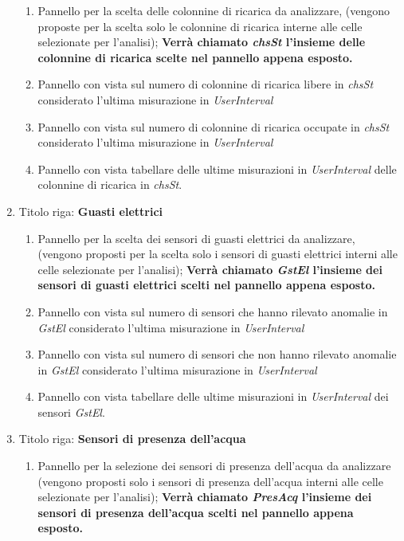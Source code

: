 \begin{enumerate}
\begin{enumerate}
    \item Pannello per la scelta delle colonnine di ricarica da analizzare, (vengono proposte per la scelta solo le  colonnine di ricarica interne alle celle selezionate per l'analisi);
    \textbf{Verrà chiamato \textit{chsSt} l'insieme delle  colonnine di ricarica scelte nel pannello appena esposto.}
    \item Pannello con vista sul numero di colonnine di ricarica libere in \textit{chsSt} considerato l'ultima misurazione in
    \textit{UserInterval} 
    \item Pannello con vista sul numero di colonnine di ricarica occupate in \textit{chsSt} considerato l'ultima misurazione in \textit{UserInterval} 
    \item Pannello con vista tabellare delle ultime misurazioni in \textit{UserInterval} delle colonnine di ricarica in \textit{chsSt}.
\end{enumerate}
\item Titolo riga: \textbf{Guasti elettrici}
\begin{enumerate}
    \item Pannello per la scelta dei sensori di guasti elettrici da analizzare, (vengono proposti per la scelta solo i sensori di guasti elettrici interni alle celle selezionate per l'analisi);
    \textbf{Verrà chiamato \textit{GstEl} l'insieme dei sensori di guasti elettrici scelti nel pannello appena esposto.}
    \item Pannello con vista sul numero di sensori che hanno rilevato anomalie in \textit{GstEl} considerato l'ultima misurazione in \textit{UserInterval} 
    \item Pannello con vista sul numero di sensori che non  hanno rilevato anomalie in \textit{GstEl} considerato l'ultima misurazione in \textit{UserInterval} 
    \item Pannello con vista tabellare delle ultime misurazioni in \textit{UserInterval} dei sensori \textit{GstEl}.
\end{enumerate}
\item Titolo riga: \textbf{Sensori di presenza dell'acqua}
\begin{enumerate}
\item Pannello per la selezione dei sensori di presenza dell'acqua da analizzare (vengono proposti solo i sensori di presenza dell'acqua interni alle celle selezionate per l'analisi);
\textbf{Verrà chiamato \textit{PresAcq} l'insieme dei sensori di presenza dell'acqua scelti nel pannello appena esposto.}

\end{enumerate}
\end{enumerate}
